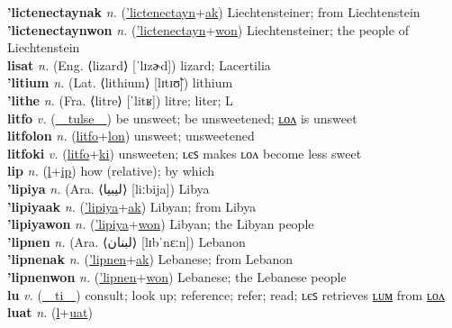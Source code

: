 \textbf{'lictenectaynak} \textit{n.} (\hyperref['lictenectayn]{'lictenectayn}+\hyperref[ak]{ak})
Liechtensteiner; from Liechtenstein \label{'lictenectaynak} \\
\textbf{'lictenectaynwon} \textit{n.} (\hyperref['lictenectayn]{'lictenectayn}+\hyperref[won]{won})
Liechtensteiner; the people of Liechtenstein \label{'lictenectaynwon} \\
\textbf{lisat} \textit{n.} (Eng. ⟨lizard⟩ [ˈlɪzɚd])
lizard; Lacertilia \label{lisat} \\
\textbf{'litium} \textit{n.} (Lat. ⟨lithium⟩ [lɪtɪʊ̃])
lithium \label{'litium} \\
\textbf{'lithe} \textit{n.} (Fra. ⟨litre⟩ [ˈlitʁ])
litre; liter; L \label{'lithe} \\
\textbf{litfo} \textit{v.} (\hyperref[tulse]{~~tulse~~})
be unsweet; be unsweetened; \hyperref[litfolon]{ʟᴏᴧ} is unsweet \label{litfo} \\
\textbf{litfolon} \textit{n.} (\hyperref[litfo]{litfo}+\hyperref[lon]{lon})
unsweet; unsweetened \label{litfolon} \\
\textbf{litfoki} \textit{v.} (\hyperref[litfo]{litfo}+\hyperref[ki]{ki})
unsweeten; ʟєꜱ makes ʟᴏᴧ become less sweet \label{litfoki} \\
\textbf{lip} \textit{n.} (\hyperref[l]{l}+\hyperref[p]{ip})
how (relative); by which \label{lip} \\
\textbf{'lipiya} \textit{n.} (Ara. ⟨ليبيا‎⟩ [liːbija])
Libya \label{'lipiya} \\
\textbf{'lipiyaak} \textit{n.} (\hyperref['lipiya]{'lipiya}+\hyperref[ak]{ak})
Libyan; from Libya \label{'lipiyaak} \\
\textbf{'lipiyawon} \textit{n.} (\hyperref['lipiya]{'lipiya}+\hyperref[won]{won})
Libyan; the Libyan people \label{'lipiyawon} \\
\textbf{'lipnen} \textit{n.} (Ara. ⟨لبنان‎⟩ [lɪbˈnɛːn])
Lebanon \label{'lipnen} \\
\textbf{'lipnenak} \textit{n.} (\hyperref['lipnen]{'lipnen}+\hyperref[ak]{ak})
Lebanese; from Lebanon \label{'lipnenak} \\
\textbf{'lipnenwon} \textit{n.} (\hyperref['lipnen]{'lipnen}+\hyperref[won]{won})
Lebanese; the Lebanese people \label{'lipnenwon} \\
\textbf{lu} \textit{v.} (\hyperref[ti]{~~ti~~})
consult; look up; reference; refer; read; ʟєꜱ retrieves \hyperref[lulum]{ʟᴜᴍ} from \hyperref[lulon]{ʟᴏᴧ} \label{lu} \\
\textbf{luat} \textit{n.} (\hyperref[l]{l}+\hyperref[at]{uat})
